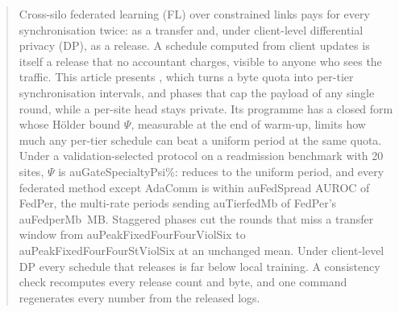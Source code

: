 \begin{abstract}
Cross-silo federated learning (FL) over constrained links pays for every synchronisation twice: as a transfer and, under client-level differential privacy (DP), as a release. A schedule computed from client updates is itself a release that no accountant charges, visible to anyone who sees the traffic. This article presents \tierfed{}, which turns a byte quota into per-tier synchronisation intervals, and phases that cap the payload of any single round, while a per-site head stays private. Its programme has a closed form whose H\"older bound $\Psi$, measurable at the end of warm-up, limits how much any per-tier schedule can beat a uniform period at the same quota. Under a validation-selected protocol on a readmission benchmark with 20 sites, $\Psi$ is \num{auGateSpecialtyPsi}\%: \tierfed{} reduces to the uniform period, and every federated method except AdaComm is within \num{auFedSpread} AUROC of FedPer, the multi-rate periods sending \num{auTierfedMb} of FedPer's \num{auFedperMb}~MB.  Staggered phases cut the rounds that miss a transfer window from \num{auPeakFixedFourFourViolSix} to \num{auPeakFixedFourFourStViolSix} at an unchanged mean. Under client-level DP every schedule that releases is far below local training. A consistency check recomputes every release count and byte, and one command regenerates every number from the released logs.
\end{abstract}
